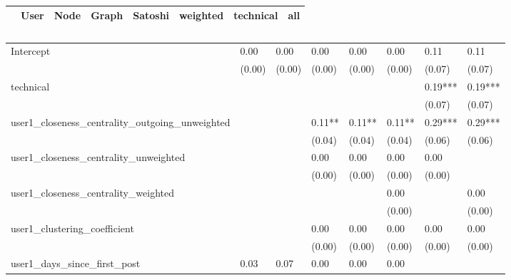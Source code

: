 \begin{table}
\caption{}
\begin{center}
\begin{tabular}{lccccccc}
\hline
                                               &   User  &   Node  &  Graph  & Satoshi & weighted & technical &   all    \\
\hline
\hline
\end{tabular}
\begin{tabular}{llllllll}
Intercept                                      & 0.00    & 0.00    & 0.00    & 0.00    & 0.00     & 0.11      & 0.11     \\
                                               & (0.00)  & (0.00)  & (0.00)  & (0.00)  & (0.00)   & (0.07)    & (0.07)   \\
technical                                      &         &         &         &         &          & 0.19***   & 0.19***  \\
                                               &         &         &         &         &          & (0.07)    & (0.07)   \\
user1_closeness_centrality_outgoing_unweighted &         &         & 0.11**  & 0.11**  & 0.11**   & 0.29***   & 0.29***  \\
                                               &         &         & (0.04)  & (0.04)  & (0.04)   & (0.06)    & (0.06)   \\
user1_closeness_centrality_unweighted          &         &         & 0.00    & 0.00    & 0.00     & 0.00      &          \\
                                               &         &         & (0.00)  & (0.00)  & (0.00)   & (0.00)    &          \\
user1_closeness_centrality_weighted            &         &         &         &         & 0.00     &           & 0.00     \\
                                               &         &         &         &         & (0.00)   &           & (0.00)   \\
user1_clustering_coefficient                   &         &         & 0.00    & 0.00    & 0.00     & 0.00      & 0.00     \\
                                               &         &         & (0.00)  & (0.00)  & (0.00)   & (0.00)    & (0.00)   \\
user1_days_since_first_post                    & 0.03    & 0.07    & 0.00    & 0.00    & 0.00     &           &          \\

\end{tabular}
\end{center}
\end{table}
